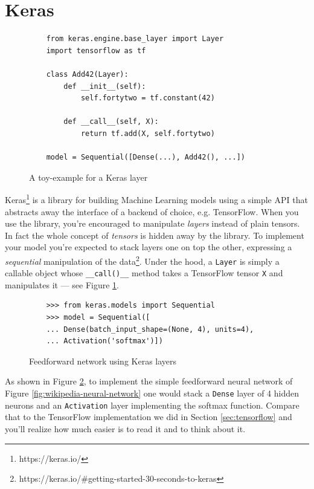 \section{Keras}
\label{sec:keras}

\begin{figure}
  \begin{verbatim}
    from keras.engine.base_layer import Layer
    import tensorflow as tf

    class Add42(Layer):
        def __init__(self):
            self.fortytwo = tf.constant(42)

        def __call__(self, X):
            return tf.add(X, self.fortytwo)

    model = Sequential([Dense(...), Add42(), ...])
  \end{verbatim}
  \caption{A toy-example for a Keras layer}
  \label{fig:toy-layer}
\end{figure}

Keras\footnote{https://keras.io/} is a library for building Machine
Learning models using a simple API that abstracts away the interface of
a backend of choice, e.g. TensorFlow. When you use the library, you're
encouraged to manipulate \emph{layers} instead of plain tensors. In
fact the whole concept of \emph{tensors} is hidden away by the library.
To implement your model you're expected to stack layers one on top the
other, expressing a \emph{sequential} manipulation of the
data\footnote{https://keras.io/\#getting-started-30-seconds-to-keras}.
Under the hood, a \texttt{Layer} is simply a callable object whose
\texttt{\_\_call()\_\_} method takes a TensorFlow tensor \texttt{X} and
manipulates it --- see Figure \ref{fig:toy-layer}.

\begin{figure}
  \begin{verbatim}
    >>> from keras.models import Sequential
    >>> model = Sequential([
    ... Dense(batch_input_shape=(None, 4), units=4),
    ... Activation('softmax')])
  \end{verbatim}
  \caption{Feedforward network using Keras layers}
  \label{fig:feedforward-with-layers}
\end{figure}

As shown in Figure \ref{fig:feedforward-with-layers}, to implement the
simple feedforward neural network of Figure
\ref{fig:wikipedia-neural-network} one would stack a \texttt{Dense}
layer of 4 hidden neurons and an \texttt{Activation} layer implementing
the softmax function. Compare that to the TensorFlow implementation we
did in Section \ref{sec:tensorflow} and you'll realize how much easier
is to read it and to think about it.


